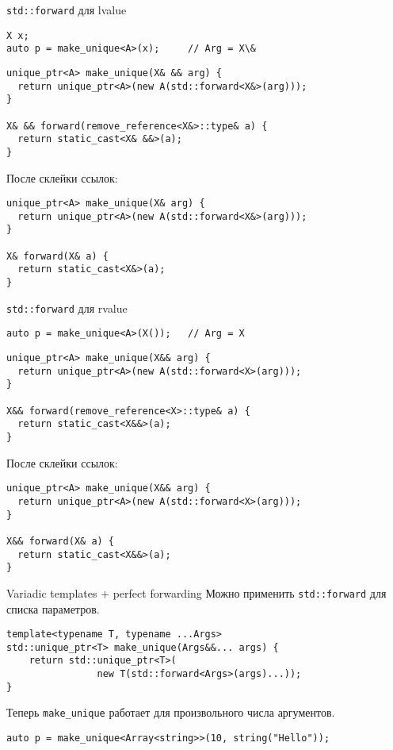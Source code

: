\documentclass{beamer}
\begin{document}
\begin{frame}[fragile]{\texttt{std::forward} для lvalue}
\begin{lstlisting}
X x;
auto p = make_unique<A>(x); 	// Arg = X\&
\end{lstlisting}

\begin{lstlisting}
unique_ptr<A> make_unique(X& && arg) { 
  return unique_ptr<A>(new A(std::forward<X&>(arg)));
} 

X& && forward(remove_reference<X&>::type& a) {
  return static_cast<X& &&>(a);
} 
\end{lstlisting}
\pause
После склейки ссылок:
\begin{lstlisting}
unique_ptr<A> make_unique(X& arg) { 
  return unique_ptr<A>(new A(std::forward<X&>(arg)));
} 

X& forward(X& a) {
  return static_cast<X&>(a);
} 
\end{lstlisting}
\end{frame}

\begin{frame}[fragile]{\texttt{std::forward} для rvalue}
\begin{lstlisting}
auto p = make_unique<A>(X());	// Arg = X
\end{lstlisting}

\begin{lstlisting}
unique_ptr<A> make_unique(X&& arg) { 
  return unique_ptr<A>(new A(std::forward<X>(arg)));
} 

X&& forward(remove_reference<X>::type& a) {
  return static_cast<X&&>(a);
} 
\end{lstlisting}
\pause
После склейки ссылок:
\begin{lstlisting}
unique_ptr<A> make_unique(X&& arg) { 
  return unique_ptr<A>(new A(std::forward<X>(arg)));
} 

X&& forward(X& a) {
  return static_cast<X&&>(a);
} 
\end{lstlisting}

\end{frame}

\begin{frame}[fragile]{Variadic templates $+$ perfect forwarding}
Можно применить \texttt{std::forward} для списка параметров.
\begin{lstlisting}
template<typename T, typename ...Args> 
std::unique_ptr<T> make_unique(Args&&... args) {
    return std::unique_ptr<T>(
                new T(std::forward<Args>(args)...));
}
\end{lstlisting}
Теперь \texttt{make\_unique} работает для произвольного числа аргументов.
\begin{lstlisting}
auto p = make_unique<Array<string>>(10, string("Hello"));
\end{lstlisting}
\end{frame}
\end{document}
